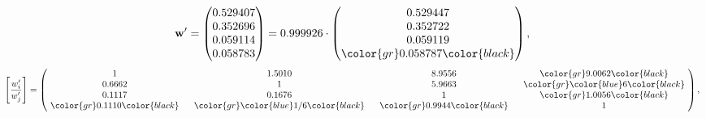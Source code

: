 \begin{example}
\begin{equation*}
\mathbf{w}^{\prime} =
\begin{pmatrix}
0.529407\\
0.352696\\
0.059114\\
0.058783
\end{pmatrix} =
0.999926\cdot
\begin{pmatrix}
0.529447\\
0.352722\\
0.059119\\
\color{gr} 0.058787\color{black}
\end{pmatrix},
\end{equation*}
\begin{equation*}
\left[ \frac{{w}^{\prime}_i}{{w}^{\prime}_j} \right] =
\begin{pmatrix}
$\,\,$ 1 $\,\,$ & $\,\,$1.5010$\,\,$ & $\,\,$8.9556$\,\,$ & $\,\,$\color{gr} 9.0062\color{black} $\,\,$ \\
$\,\,$0.6662$\,\,$ & $\,\,$ 1 $\,\,$ & $\,\,$5.9663$\,\,$ & $\,\,$\color{gr} \color{blue} 6\color{black}   $\,\,$ \\
$\,\,$0.1117$\,\,$ & $\,\,$0.1676$\,\,$ & $\,\,$ 1 $\,\,$ & $\,\,$\color{gr} 1.0056\color{black}  $\,\,$ \\
$\,\,$\color{gr} 0.1110\color{black} $\,\,$ & $\,\,$\color{gr} \color{blue}  1/6\color{black} $\,\,$ & $\,\,$\color{gr} 0.9944\color{black} $\,\,$ & $\,\,$ 1  $\,\,$ \\
\end{pmatrix},
\end{equation*}
\end{example}
\newpage
